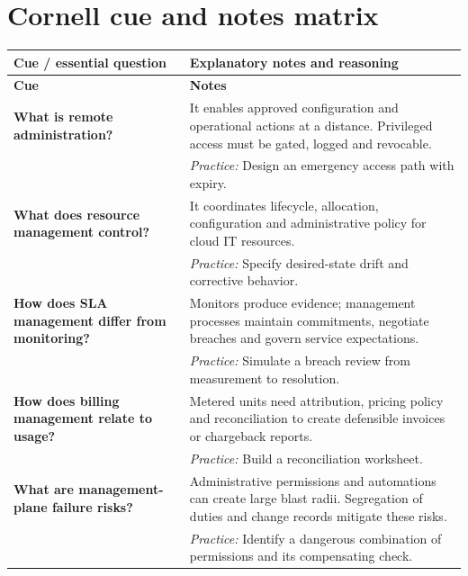 \documentclass[10pt,letterpaper]{article}
\begin{document}
\section{Cornell cue and notes matrix}
\small\setlength{\LTleft}{0pt}\setlength{\LTright}{0pt plus 1fill}
\begin{longtable}{>{\RaggedRight\arraybackslash}p{}>{\RaggedRight\arraybackslash}p{}}
\toprule\textbf{Cue / essential question}&\textbf{Explanatory notes and reasoning}\\\midrule\endfirsthead\toprule\textbf{Cue}&\textbf{Notes}\\\midrule\endhead
\textbf{What is remote administration?} & It enables approved configuration and operational actions at a distance. Privileged access must be gated, logged and revocable.\\[3pt]& \textcolor{petrol}{\emph{Practice:} Design an emergency access path with expiry.}\\[8pt]\midrule
\textbf{What does resource management control?} & It coordinates lifecycle, allocation, configuration and administrative policy for cloud IT resources.\\[3pt]& \textcolor{petrol}{\emph{Practice:} Specify desired-state drift and corrective behavior.}\\[8pt]\midrule
\textbf{How does SLA management differ from monitoring?} & Monitors produce evidence; management processes maintain commitments, negotiate breaches and govern service expectations.\\[3pt]& \textcolor{petrol}{\emph{Practice:} Simulate a breach review from measurement to resolution.}\\[8pt]\midrule
\textbf{How does billing management relate to usage?} & Metered units need attribution, pricing policy and reconciliation to create defensible invoices or chargeback reports.\\[3pt]& \textcolor{petrol}{\emph{Practice:} Build a reconciliation worksheet.}\\[8pt]\midrule
\textbf{What are management-plane failure risks?} & Administrative permissions and automations can create large blast radii. Segregation of duties and change records mitigate these risks.\\[3pt]& \textcolor{petrol}{\emph{Practice:} Identify a dangerous combination of permissions and its compensating check.}\\[8pt]\midrule
\end{longtable}\normalsize
\end{document}
